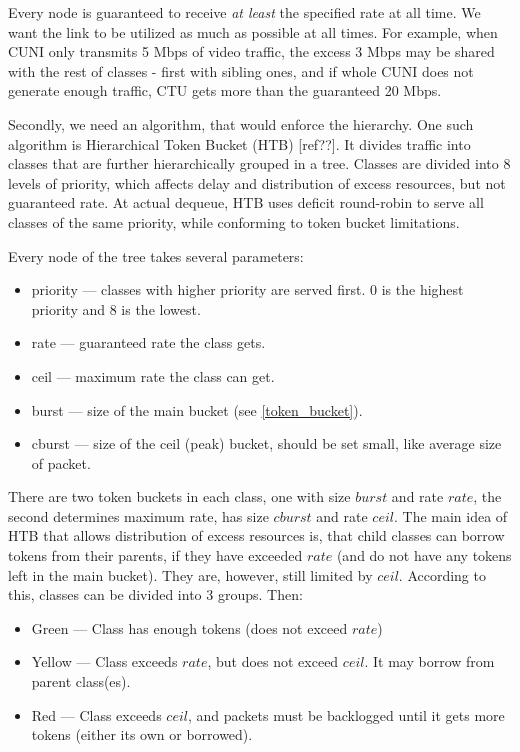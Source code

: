 Every node is guaranteed to receive \textit{at least} the specified rate at all time. We want the link to be utilized as much as possible at all times. For example, when CUNI only transmits 5 Mbps of video traffic, the excess 3 Mbps may be shared with the rest of classes - first with sibling ones, and if whole CUNI does not generate enough traffic, CTU gets more than the guaranteed 20 Mbps.


Secondly, we need an algorithm, that would enforce the hierarchy. One such algorithm is Hierarchical Token Bucket (HTB) [ref??]. It divides traffic into classes that are further hierarchically grouped in a tree. Classes are divided into 8 levels of priority, which affects delay and distribution of excess resources, but not guaranteed rate. At actual dequeue, HTB uses deficit round-robin to serve all classes of the same priority, while conforming to token bucket limitations.

Every node of the tree takes several parameters:
\begin{itemize}
	\item priority --- classes with higher priority are served first. 0 is the highest priority and 8 is the lowest.
	\item rate --- guaranteed rate the class gets.
	\item ceil --- maximum rate the class can get.
	\item burst --- size of the main bucket (see \ref{token_bucket}).
	\item cburst --- size of the ceil (peak) bucket, should be set small, like average size of packet.
\end{itemize}

There are two token buckets in each class, one with size $burst$ and rate $rate$, the second determines maximum rate, has size $cburst$ and rate $ceil$. The main idea of HTB that allows distribution of excess resources is, that child classes can borrow tokens from their parents, if they have exceeded $rate$ (and do not have any tokens left in the main bucket). They are, however, still limited by $ceil$. According to this, classes can be divided into 3 groups. Then:
\begin{itemize}
	\item Green --- Class has enough tokens (does not exceed $rate$)
	\item Yellow --- Class exceeds $rate$, but does not exceed $ceil$. It may borrow from parent class(es).
	\item Red --- Class exceeds $ceil$, and packets must be backlogged until it gets more tokens (either its own or borrowed).
\end{itemize}


